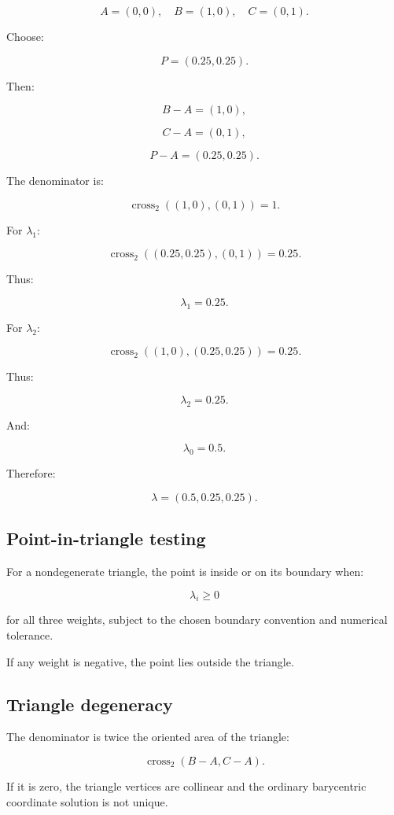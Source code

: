 \[
 A=(0,0),\quad B=(1,0),\quad C=(0,1).
\]

Choose:

\[
 P=(0.25,0.25).
\]

Then:

\[
 B-A=(1,0),
\]

\[
 C-A=(0,1),
\]

\[
 P-A=(0.25,0.25).
\]

The denominator is:

\[
 \operatorname{cross}_2((1,0),(0,1))=1.
\]

For \(\lambda_1\):

\[
 \operatorname{cross}_2((0.25,0.25),(0,1))=0.25.
\]

Thus:

\[
 \lambda_1=0.25.
\]

For \(\lambda_2\):

\[
 \operatorname{cross}_2((1,0),(0.25,0.25))=0.25.
\]

Thus:

\[
 \lambda_2=0.25.
\]

And:

\[
 \lambda_0=0.5.
\]

Therefore:

\[
 \boxed{ \lambda=(0.5,0.25,0.25) }.
\]

\subsection{Point-in-triangle testing}\label{02-foundations-ii-ch034-point-in-triangle-testing}

For a nondegenerate triangle, the point is inside or on its boundary when:

\[
 \boxed{ \lambda_i\ge0 }
\]

for all three weights, subject to the chosen boundary convention and numerical tolerance.

If any weight is negative, the point lies outside the triangle.

\subsection{Triangle degeneracy}\label{02-foundations-ii-ch034-triangle-degeneracy}

The denominator is twice the oriented area of the triangle:

\[
 \operatorname{cross}_2(B-A,C-A).
\]

If it is zero, the triangle vertices are collinear and the ordinary barycentric coordinate solution is not unique.


